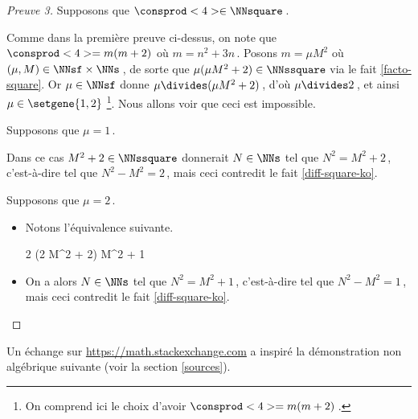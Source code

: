 \begin{proof}[Preuve 3]%
    Supposons que $\consprod<4> \in \NNsquare$\,.
    
    \smallskip
    
    Comme dans la première preuve ci-dessus, on note que $\consprod<4> = m (m + 2)$ où $m = n^2 + 3n$\,.
    Posons $m = \mu M^2$ où $(\mu, M) \in \NNsf \times \NNs$\,,
    de sorte que $\mu (\mu M^2 + 2) \in \NNssquare$ via le fait \ref{facto-square}.
    Or $\mu \in \NNsf$ donne $\mu \divides (\mu M^2 + 2)$\,, 
    d'où $\mu \divides 2$\,, et ainsi $\mu \in \setgene{1, 2}$
    \footnote{
    	On comprend ici le choix d'avoir $\consprod<4> = m (m + 2)$\,.
    }.
    Nous allons voir que ceci est impossible.
    
    \medskip
    
    Supposons que $\mu = 1$\,.
   
   	\smallskip
	
	Dans ce cas $M^2 + 2 \in \NNssquare$ donnerait $N \in \NNs$ tel que $N^2 = M^2 + 2$\,, c'est-à-dire tel que $N^2 - M^2 = 2$\,, mais ceci contredit le fait \ref{diff-square-ko}.
    
    \medskip
    
	Supposons que $\mu = 2$\,.
    \begin{itemize}
    	\item Notons l'équivalence suivante.
        
        \noindent\kern-6pt%
        \begin{stepcalc}[style=ar*, ope=\iff]
        	2 (2 M^2 + 2) \in \NNssquare
        	M^2 + 1 \in \NNssquare
        \end{stepcalc}

		\item On a alors $N \in \NNs$ tel que $N^2 = M^2 + 1$\,, c'est-à-dire tel que $N^2 - M^2 = 1$\,, mais ceci contredit le fait \ref{diff-square-ko}.
		\qedhere 
    \end{itemize}   
\end{proof}




Un échange sur \url{https://math.stackexchange.com} a inspiré la démonstration non algébrique suivante (voir la section \ref{sources}).	
	
